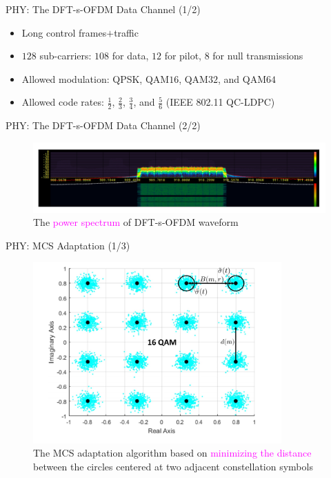 \documentclass{beamer}
\begin{document}
\begin{frame}{PHY: The DFT-s-OFDM Data Channel (1/2)}
    \begin{itemize}
        \item Long control frames${+}$traffic
        \item $128$ sub-carriers: $108$ for data, $12$ for pilot, $8$ for null transmissions
        \item Allowed modulation: QPSK, QAM$16$, QAM$32$, and QAM$64$
        \item Allowed code rates: $\frac{1}{2}$, $\frac{2}{3}$, $\frac{3}{4}$, and $\frac{5}{6}$ (IEEE 802.11 QC-LDPC)
    \end{itemize}
\end{frame}
\begin{frame}{PHY: The DFT-s-OFDM Data Channel (2/2)}
\begin{figure}
    \centering
    \includegraphics[width = 1.0\textwidth]{Data_Channel_DFT-spread-OFDM_Power_Spectrum.PNG}
    \caption{The \textcolor{magenta}{power spectrum} of DFT-s-OFDM waveform}
    \label{fig:6}
\end{figure}
\end{frame}
\begin{frame}{PHY: MCS Adaptation (1/3)}
\begin{figure}
    \centering
    \includegraphics[width = 0.85\textwidth]{MCS_Constellation_Diagram.PNG}
    \caption{The MCS adaptation algorithm based on \textcolor{magenta}{minimizing the distance} between the circles centered at two adjacent constellation symbols}
    \label{fig:7}
\end{figure}
\end{frame}
\end{document}
